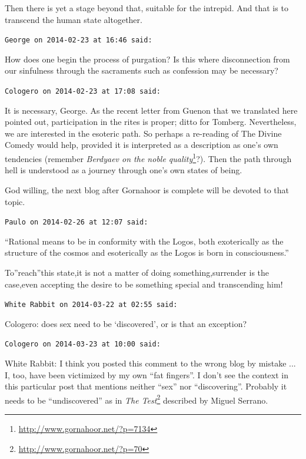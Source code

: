 \begin{footnotesize}
\begin{sffamily}
Then there is yet a stage beyond that, suitable for the intrepid. And that is to transcend the human state altogether.

\hfill

\texttt{George on 2014-02-23 at 16:46 said:}

How does one begin the process of purgation? Is this where disconnection from our sinfulness through the sacraments such as confession may be necessary?

\hfill

\texttt{Cologero on 2014-02-23 at 17:08 said:}

It is necessary, George. As the recent letter from Guenon that we translated here pointed out, participation in the rites is proper; ditto for Tomberg. Nevertheless, we are interested in the esoteric path. So perhaps a re-reading of The Divine Comedy would help, provided it is interpreted as a description as one's own tendencies (remember \textit{Berdyaev on the noble quality}\footnote{\url{http://www.gornahoor.net/?p=7134}}?). Then the path through hell is understood as a journey through one's own states of being.

God willing, the next blog after Gornahoor is complete will be devoted to that topic.

\hfill

\texttt{Paulo on 2014-02-26 at 12:07 said:}

``Rational means to be in conformity with the Logos, both exoterically as the structure of the cosmos and esoterically as the Logos is born in consciousness.''

To''reach''this state,it is not a matter of doing something,surrender is the case,even accepting the desire to be something special and transcending him!

\hfill

\texttt{White Rabbit on 2014-03-22 at 02:55 said:}

Cologero: does sex need to be `discovered', or is that an exception?

\hfill

\texttt{Cologero on 2014-03-23 at 10:00 said:}

White Rabbit: I think you posted this comment to the wrong blog by mistake ... I, too, have been victimized by my own ``fat fingers''. I don't see the context in this particular post that mentions neither ``sex'' nor ``discovering''. Probably it needs to be ``undiscovered'' as in \textit{The Test}\footnote{\url{http://www.gornahoor.net/?p=70}} described by Miguel Serrano.


\end{sffamily}
\end{footnotesize}
